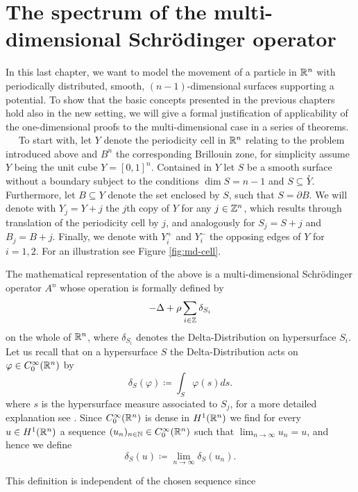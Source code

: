\chapter{The spectrum of the multi-dimensional Schrödinger operator}  \label{chap:7} 

In this last chapter, we want to model the movement of a particle in $\mathbb{R}^{n}$ with periodically distributed, smooth, $(n-1)$-dimensional surfaces supporting a potential. To show that the basic concepts presented in the previous chapters hold also in the new setting, we will give a formal justification of applicability of the one-dimensional proofs to the multi-dimensional case in a series of theorems.
~\newline ~\newline
To start with, let $Y$ denote the periodicity cell in $\mathbb{R}^{n}$ relating to the problem introduced above and $B^{n}$ the corresponding Brillouin zone, for simplicity assume $Y$ being the unit cube $Y = [0, 1]^{n}$. Contained in $Y$ let $S$ be a smooth surface without a boundary subject to the conditions $\dim S = n - 1$ and $S \subseteq \overset{\circ}{Y}$. Furthermore, let $B \subseteq Y$ denote the set enclosed by $S$, such that $S = \partial B$. We will denote with $Y_{j} = Y + j$ the $j$th copy of $Y$ for any $j \in \mathbb{Z}^{n}$, which results through translation of the periodicity cell by $j$, and analogously for $S_{j} = S + j$ and $B_{j} = B + j$. Finally, we denote with $Y_{i}^{+}$ and $Y_{i}^{-}$ the opposing edges of $Y$ for $i = 1, 2$. For an illustration see Figure \ref{fig:md-cell}.
~\newline

The mathematical representation of the above is a multi-dimensional Schrödinger operator $A^{n}$ whose operation is formally defined by
\begin{equation}
	- \Delta + \rho \sum_{i \in \mathbb{Z}} \delta_{S_{i}} \label{eq:7.1-md_the_operator_A_formallyy}
\end{equation}
on the whole of $\mathbb{R}^{n}$, where $\delta_{S_{i}}$ denotes the Delta-Distribution on hypersurface $S_{i}$. Let us recall that on a hypersurface $S$ the Delta-Distribution acts on $\varphi \in C_{0}^{\infty}(\mathbb{R}^{n})$ by 
	\[ \delta_{S}\left(\varphi\right) \coloneqq \int_{S} \varphi(s) ds . \]
where $s$ is the hypersurface measure associated to $S_{j}$, for a more detailed explanation see \cite[chapter 14]{forster2012analysis}. Since $C_{0}^{\infty}(\mathbb{R}^{n})$ is dense in $H^{1}(\mathbb{R}^{n})$ we find for every $u \in H^{1}(\mathbb{R}^{n})$ a sequence $(u_{n})_{n \in \mathbb{N}} \in C_{0}^{\infty}(\mathbb{R}^{n})$ such that $\lim_{n \rightarrow \infty} u_{n} = u$, and hence we define
	\[ \delta_{S}\left(u\right) \coloneqq \lim_{n \rightarrow \infty} \delta_{S}\left(u_{n}\right) . \]
\begin{remark}
	This definition is independent of the chosen sequence since	 %
\end{remark}

